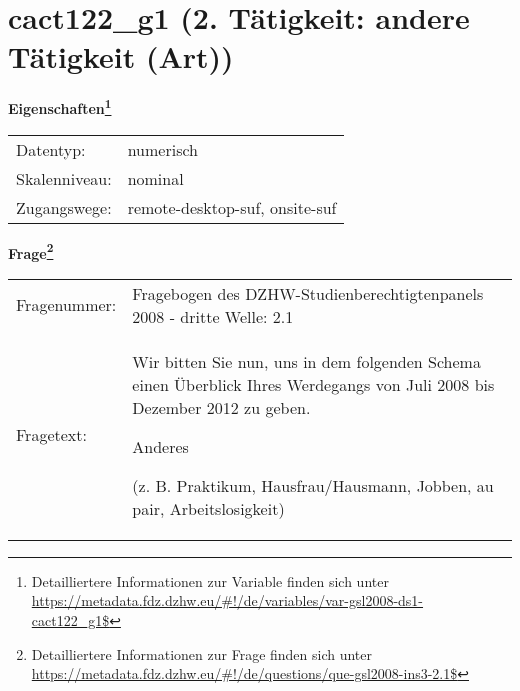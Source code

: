 
    \setcounter{footnote}{0}

    \vspace*{-1.8cm}
	\section{cact122\_g1 (2. Tätigkeit: andere Tätigkeit (Art))}
	\label{section:cact122_g1}



    \vspace*{0.5cm}
    \noindent\textbf{Eigenschaften\footnote{Detailliertere Informationen zur Variable finden sich unter
		\url{https://metadata.fdz.dzhw.eu/\#!/de/variables/var-gsl2008-ds1-cact122_g1$}}}\\
	\begin{tabularx}{\hsize}{@{}lX}
	Datentyp: & numerisch \\
	Skalenniveau: & nominal \\
	Zugangswege: &
	  remote-desktop-suf, 
	  onsite-suf
 \\
    \end{tabularx}



				\vspace*{0.5cm}
                \noindent\textbf{Frage\footnote{Detailliertere Informationen zur Frage finden sich unter
		              \url{https://metadata.fdz.dzhw.eu/\#!/de/questions/que-gsl2008-ins3-2.1$}}}\\
				\begin{tabularx}{\hsize}{@{}lX}
					Fragenummer: &
					  Fragebogen des DZHW-Studienberechtigtenpanels 2008 - dritte Welle:
					  2.1
 \\
					Fragetext: & Wir bitten Sie nun, uns in dem folgenden Schema einen Überblick Ihres Werdegangs von Juli 2008 bis Dezember 2012 zu geben.\par  Anderes\par  (z. B. Praktikum, Hausfrau/Hausmann, Jobben, au pair, Arbeitslosigkeit) \\
				\end{tabularx}






